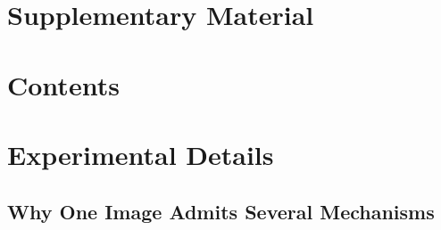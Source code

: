 \documentclass{article} %
\theoremstyle{defstyle}
\theoremstyle{plain}
\begin{document}
\section*{Supplementary Material}

\makeatletter
\let\supp@addcontentsline\addcontentsline
\def\supp@toc{toc}
\renewcommand\addcontentsline[3]{%
  \begingroup
    \def\supp@arg{#1}%
    \ifx\supp@arg\supp@toc
      \endgroup\supp@addcontentsline{stoc}{#2}{#3}%
    \else
      \endgroup\supp@addcontentsline{#1}{#2}{#3}%
    \fi}
\begingroup
  \renewcommand{\contentsname}{\normalsize Contents}
  \setlength{\parskip}{0pt}
  \setcounter{tocdepth}{2}
  \footnotesize
  \section*{\contentsname}
\endgroup
\makeatother
\bigskip



\section{Experimental Details}

\subsection{Why One Image Admits Several Mechanisms}
\label{sec:supp-concept}
\end{document}
